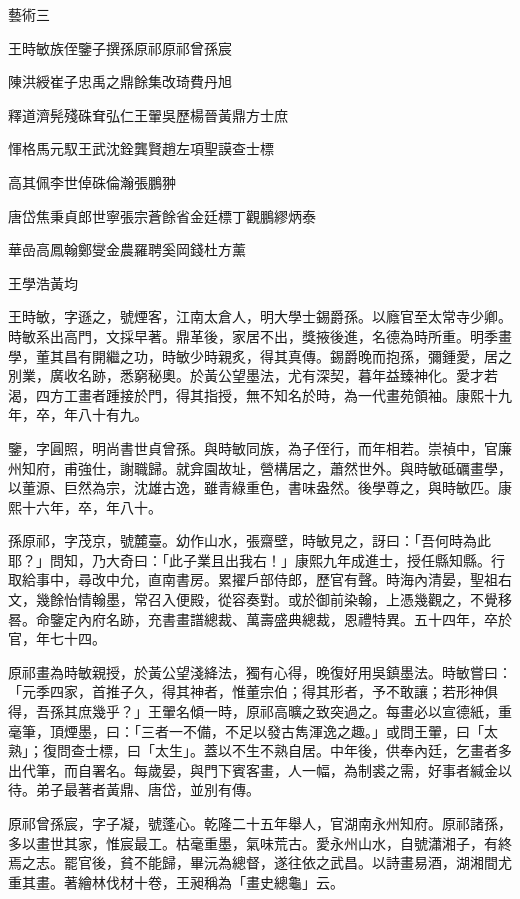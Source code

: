 
\begin{pinyinscope}
藝術三

王時敏族侄鑒子撰孫原祁原祁曾孫宸

陳洪綬崔子忠禹之鼎餘集改琦費丹旭

釋道濟髡殘硃耷弘仁王翬吳歷楊晉黃鼎方士庶

惲格馬元馭王武沈銓龔賢趙左項聖謨查士標

高其佩李世倬硃倫瀚張鵬翀

唐岱焦秉貞郎世寧張宗蒼餘省金廷標丁觀鵬繆炳泰

華嵒高鳳翰鄭燮金農羅聘奚岡錢杜方薰

王學浩黃均

王時敏，字遜之，號煙客，江南太倉人，明大學士錫爵孫。以廕官至太常寺少卿。時敏系出高門，文採早著。鼎革後，家居不出，獎掖後進，名德為時所重。明季畫學，董其昌有開繼之功，時敏少時親炙，得其真傳。錫爵晚而抱孫，彌鍾愛，居之別業，廣收名跡，悉窮秘奧。於黃公望墨法，尤有深契，暮年益臻神化。愛才若渴，四方工畫者踵接於門，得其指授，無不知名於時，為一代畫苑領袖。康熙十九年，卒，年八十有九。

鑒，字圓照，明尚書世貞曾孫。與時敏同族，為子侄行，而年相若。崇禎中，官廉州知府，甫強仕，謝職歸。就弇園故址，營構居之，蕭然世外。與時敏砥礪畫學，以董源、巨然為宗，沈雄古逸，雖青綠重色，書味盎然。後學尊之，與時敏匹。康熙十六年，卒，年八十。

孫原祁，字茂京，號麓臺。幼作山水，張齋壁，時敏見之，訝曰：「吾何時為此耶？」問知，乃大奇曰：「此子業且出我右！」康熙九年成進士，授任縣知縣。行取給事中，尋改中允，直南書房。累擢戶部侍郎，歷官有聲。時海內清晏，聖祖右文，幾餘怡情翰墨，常召入便殿，從容奏對。或於御前染翰，上憑幾觀之，不覺移晷。命鑒定內府名跡，充書畫譜總裁、萬壽盛典總裁，恩禮特異。五十四年，卒於官，年七十四。

原祁畫為時敏親授，於黃公望淺絳法，獨有心得，晚復好用吳鎮墨法。時敏嘗曰：「元季四家，首推子久，得其神者，惟董宗伯；得其形者，予不敢讓；若形神俱得，吾孫其庶幾乎？」王翬名傾一時，原祁高曠之致突過之。每畫必以宣德紙，重毫筆，頂煙墨，曰：「三者一不備，不足以發古雋渾逸之趣。」或問王翬，曰「太熟」；復問查士標，曰「太生」。蓋以不生不熟自居。中年後，供奉內廷，乞畫者多出代筆，而自署名。每歲晏，與門下賓客畫，人一幅，為制裘之需，好事者緘金以待。弟子最著者黃鼎、唐岱，並別有傳。

原祁曾孫宸，字子凝，號蓬心。乾隆二十五年舉人，官湖南永州知府。原祁諸孫，多以畫世其家，惟宸最工。枯毫重墨，氣味荒古。愛永州山水，自號瀟湘子，有終焉之志。罷官後，貧不能歸，畢沅為總督，遂往依之武昌。以詩畫易酒，湖湘間尤重其畫。著繪林伐材十卷，王昶稱為「畫史總龜」云。


\end{pinyinscope}
